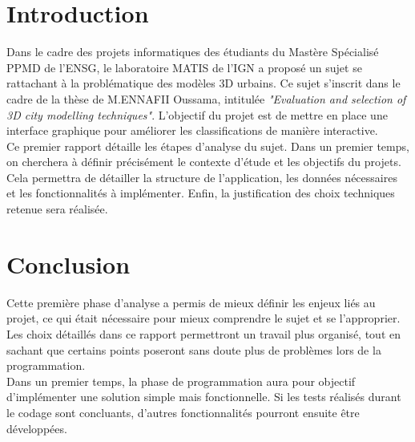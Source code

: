 \documentclass{themeensg}
\begin{document}
\newpage
\chapter*{Introduction}
  
  \vspace{1.5cm}
Dans le cadre des projets informatiques des étudiants du Mastère Spécialisé PPMD de l'ENSG, le laboratoire MATIS de l'IGN a proposé un sujet se rattachant à la problématique des modèles 3D urbains. Ce sujet s'inscrit dans le cadre de la thèse de M.ENNAFII Oussama, intitulée \emph{"Evaluation and selection of 3D city modelling techniques"}. L'objectif du projet est de mettre en place une interface graphique pour améliorer les classifications de manière interactive.\\

Ce premier rapport détaille les étapes d'analyse du sujet. Dans un premier temps, on cherchera à définir précisément le contexte d'étude et les objectifs du projets. Cela permettra de détailler la structure de l'application, les données nécessaires et les fonctionnalités à implémenter. Enfin, la justification des choix techniques retenue sera réalisée.






\newpage
\chapter*{Conclusion}
  \vspace{1.5cm}
Cette première phase d'analyse a permis de mieux définir les enjeux liés au projet, ce qui était nécessaire pour mieux comprendre le sujet et se l'approprier. Les choix détaillés dans ce rapport permettront un travail plus organisé, tout en sachant que certains points poseront sans doute plus de problèmes lors de la programmation.\\

Dans un premier temps, la phase de programmation aura pour objectif d'implémenter une solution simple mais fonctionnelle. Si les tests réalisés durant le codage sont concluants, d'autres fonctionnalités pourront ensuite être développées.\\
\end{document}
